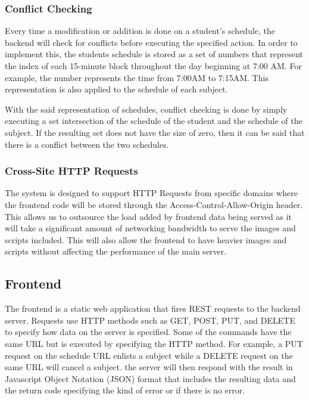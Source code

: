 \documentclass[draft]{sigchi}
\begin{document}
\subsubsection{Conflict Checking}

Every time a modification or addition is done on a student's schedule, the 
backend will check for conflicts before executing the specified action. 
In order to implement this, the students schedule is stored as a set of numbers
that represent the index of each 15-minute block throughout the day beginning at
7:00 AM. For example, the number represents the time from 7:00AM to 7:15AM. This
representation is also applied to the schedule of each subject. 

With the said representation of schedules, conflict checking is done by simply executing
a set intersection of the schedule of the student and the schedule of the subject. If the
resulting set does not have the size of zero, then it can be said that there is a conflict
between the two schedules.

\subsubsection{Cross-Site HTTP Requests}

The system is designed to support HTTP Requests from specific domains
where the frontend code will be stored through the Access-Control-Allow-Origin header. 
This allows us to outsource the load added by frontend data being served as 
it will take a significant amount of networking bandwidth to serve the images and
scripts included. This will also allow the frontend to have heavier images and 
scripts without affecting the performance of the main server. 

\subsection{Frontend}

The frontend is a static web application that fires REST requests to the
backend server. Requests use HTTP methods such as GET, POST, PUT, and DELETE to 
specify how data on the server is specified. Some of the commands have the same URL
but is executed by specifying the HTTP method. For example, a PUT request on the schedule
URL enlists a subject while a DELETE request on the same URL will cancel a subject. the
server will then respond with the result in Javascript Object Notation (JSON) format that
includes the resulting data and the return code specifying the kind of error or if there is
no error.
\end{document}
